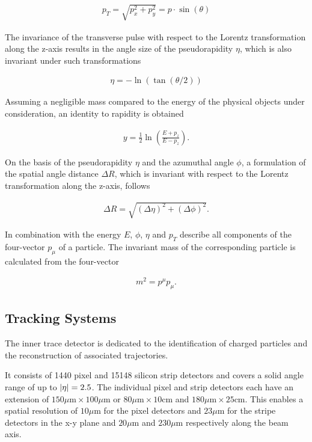 \documentclass[12pt, a4paper]{thesis}
\begin{document}
\begin{align}
p_T = \sqrt{p_x^2 + p_y^2} = p \cdot \sin(\theta)
\end{align}

The invariance of the transverse pulse with respect to the Lorentz
transformation along the z-axis results in the angle size of the pseudorapidity
\(\eta\), which is also invariant under such transformations

\begin{align}
\eta = - \ln(\tan(\theta/2))
\end{align}

Assuming a negligible mass compared to the energy of the physical objects under
consideration, an identity to rapidity is obtained 

\begin{align}
 y = \frac{1}{2} \ln(\frac{E+p_z}{E-p_z}).
\end{align}

On the basis of the pseudorapidity \(\eta\) and the azumuthal angle \(\phi\), a
formulation of the spatial angle distance \(\Delta R\), which is invariant with
respect to the Lorentz transformation along the z-axis, follows

\begin{align}
\Delta R = \sqrt{(\Delta \eta)^{2} + (\Delta \phi)^{2}}.
\end{align}

In combination with the energy \(E\), \(\phi\), \(\eta\) and \(p_{T}\) describe all components of
the four-vector \(p_{\mu}\) of a particle. The invariant mass of the corresponding
particle is calculated from the four-vector

\begin{align}
m^{2} = p^{\mu}p_{\mu}.
\end{align}

\subsection{Tracking Systems}
\label{sec:org139ed11}
The inner trace detector is dedicated to the identification of charged particles
and the reconstruction of associated trajectories. 

It consists of 1440 pixel and 15148 silicon strip detectors and covers a solid
angle range of up to \(\abs{\eta} = 2.5\). The individual pixel and strip
detectors each have an extension of \(150\mu \text{m} \times 100 \mu \text{m}\) or
\(80\mu \text{m} \times 10 \text{cm}\) and \(180\mu \text{m} \times 25 \text{cm}\).
This enables a spatial resolution of \(10\mu \text{m}\) for the pixel detectors
and \(23\mu \text{m}\) for the stripe detectors in the x-y plane and \(20\mu
\text{m}\) and \(230\mu \text{m}\) respectively along the beam axis.
\end{document}
